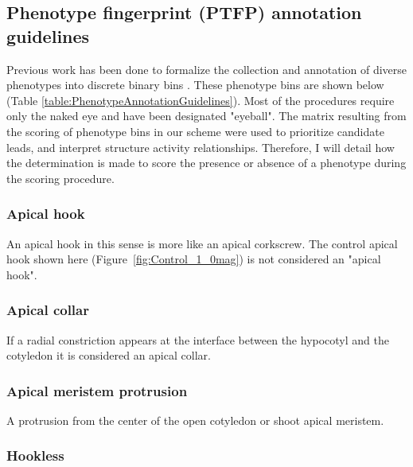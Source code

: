 




\subsection{Phenotype fingerprint (PTFP) annotation guidelines}

Previous work has been done to formalize the collection and annotation of diverse phenotypes into discrete binary bins \cite{chow2007latca}. These phenotype bins are shown below (Table \ref{table:PhenotypeAnnotationGuidelines}). Most of the procedures require only the naked eye and have been designated "eyeball". The matrix resulting from the scoring of phenotype bins in our scheme were used to prioritize candidate leads, and interpret structure activity relationships. Therefore, I will detail how the determination is made to score the presence or absence of a phenotype during the scoring procedure. 

\subsubsection{Apical hook}

An apical hook in this sense is more like an apical corkscrew. The control apical hook shown here (Figure~\ref{fig:Control_1_0mag}) is not considered an "apical hook". 

\subsubsection{Apical collar}

If a radial constriction appears at the interface between the hypocotyl and the cotyledon it is considered an apical collar. 

\subsubsection{Apical meristem protrusion}

A protrusion from the center of the open cotyledon or shoot apical meristem. 

\subsubsection{Hookless}

